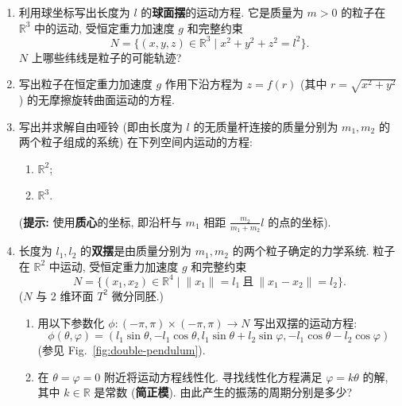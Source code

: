 \begin{RiemannExercise}\label{ex:holonomic-constraints}
\begin{enumerate}[label=(\arabic*),ref=\arabic*,leftmargin=*]
\item\label{ex:spherical-pendulum-motion} 利用球坐标写出长度为 $l$ 的\textbf{球面摆}的运动方程. 它是质量为 $m>0$ 的粒子在 $\mathbb{R}^3$ 中的运动, 受恒定重力加速度 $g$ 和完整约束
\[
  N=\{(x,y,z)\in\mathbb{R}^3\mid x^2+y^2+z^2=l^2\}.
\]
$N$ 上哪些纬线是粒子的可能轨迹?
\item\label{ex:particle-on-frictionless-surface-of-revolution} 写出粒子在恒定重力加速度 $g$ 作用下沿方程为 $z=f(r)$ (其中 $r=\sqrt{x^2+y^2}$) 的无摩擦旋转曲面运动的方程.
\item\label{ex:free-dumbbell-motion} 写出并求解自由哑铃 (即由长度为 $l$ 的无质量杆连接的质量分别为 $m_1,m_2$ 的两个粒子组成的系统) 在下列空间内运动的方程:
\begin{enumerate}[label=(\alph*),leftmargin=*]
\item $\mathbb{R}^2$;
\item $\mathbb{R}^3$.
\end{enumerate}
{\small (\textbf{提示:} 使用\textbf{质心}的坐标, 即沿杆与 $m_1$ 相距 $\frac{m_2}{m_1+m_2}l$ 的点的坐标).}
\item\label{ex:double-pendulum-motion} 长度为 $l_1,l_2$ 的\textbf{双摆}是由质量分别为 $m_1,m_2$ 的两个粒子确定的力学系统. 粒子在 $\mathbb{R}^2$ 中运动, 受恒定重力加速度 $g$ 和完整约束
\[
  N=\{(x_1,x_2)\in\mathbb{R}^4\mid\lVert x_1\rVert=l_1\ \text{且}\ \lVert x_1-x_2\rVert=l_2\}.
\]
($N$ 与 2 维环面 $T^2$ 微分同胚.)
\begin{enumerate}[label=(\alph*),leftmargin=*]
\item 用以下参数化 $\phi:(-\pi,\pi)\times(-\pi,\pi)\to N$ 写出双摆的运动方程:
\[
  \phi(\theta,\varphi)=
  (l_1\sin\theta,-l_1\cos\theta,l_1\sin\theta+l_2\sin\varphi,-l_1\cos\theta-l_2\cos\varphi)
\]
(参见 Fig.~\ref{fig:double-pendulum}).
\item 在 $\theta=\varphi=0$ 附近将运动方程线性化. 寻找线性化方程满足 $\varphi=k\theta$ 的解, 其中 $k\in\mathbb{R}$ 是常数 (\textbf{简正模}). 由此产生的振荡的周期分别是多少?
\end{enumerate}
\end{enumerate}
\end{RiemannExercise}
